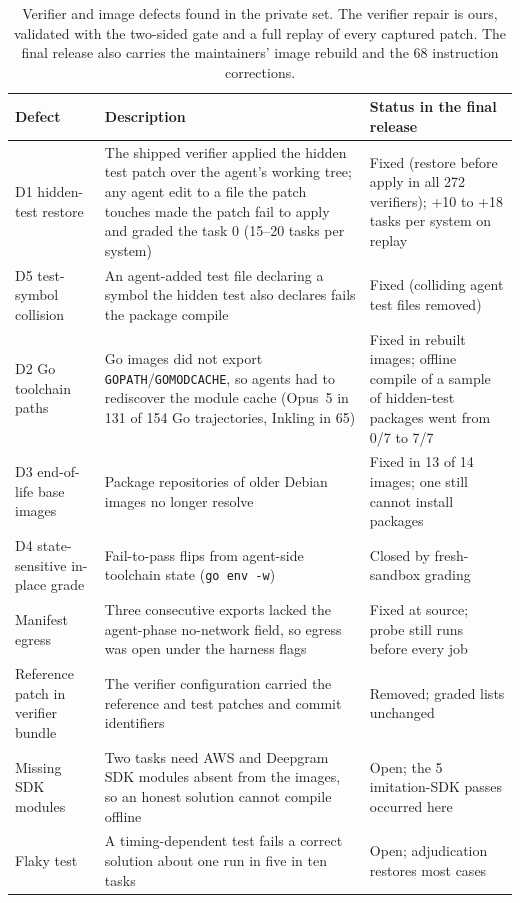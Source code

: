 \begin{table}[t]
\centering\small
\begin{tabular}{p{}p{}p{}}
\toprule
Defect & Description & Status in the final release \\
\midrule
D1 hidden-test restore & The shipped verifier applied the hidden test patch over the agent's working tree; any agent edit to a file the patch touches made the patch fail to apply and graded the task 0 (15--20 tasks per system) & Fixed (restore before apply in all 272 verifiers); +10 to +18 tasks per system on replay \\
D5 test-symbol collision & An agent-added test file declaring a symbol the hidden test also declares fails the package compile & Fixed (colliding agent test files removed) \\
D2 Go toolchain paths & Go images did not export \texttt{GOPATH}/\texttt{GOMODCACHE}, so agents had to rediscover the module cache (Opus~5 in 131 of 154 Go trajectories, Inkling in 65) & Fixed in rebuilt images; offline compile of a sample of hidden-test packages went from 0/7 to 7/7 \\
D3 end-of-life base images & Package repositories of older Debian images no longer resolve & Fixed in 13 of 14 images; one still cannot install packages \\
D4 state-sensitive in-place grade & Fail-to-pass flips from agent-side toolchain state (\texttt{go env -w}) & Closed by fresh-sandbox grading \\
Manifest egress & Three consecutive exports lacked the agent-phase no-network field, so egress was open under the harness flags & Fixed at source; probe still runs before every job \\
Reference patch in verifier bundle & The verifier configuration carried the reference and test patches and commit identifiers & Removed; graded lists unchanged \\
Missing SDK modules & Two tasks need AWS and Deepgram SDK modules absent from the images, so an honest solution cannot compile offline & Open; the 5 imitation-SDK passes occurred here \\
Flaky test & A timing-dependent test fails a correct solution about one run in five in ten tasks & Open; adjudication restores most cases \\
\bottomrule
\end{tabular}
\caption{Verifier and image defects found in the private set. The verifier repair is ours, validated with the two-sided gate and a full replay of every captured patch. The final release also carries the maintainers' image rebuild and the 68 instruction corrections.}
\label{tab:privdefects}
\end{table}
